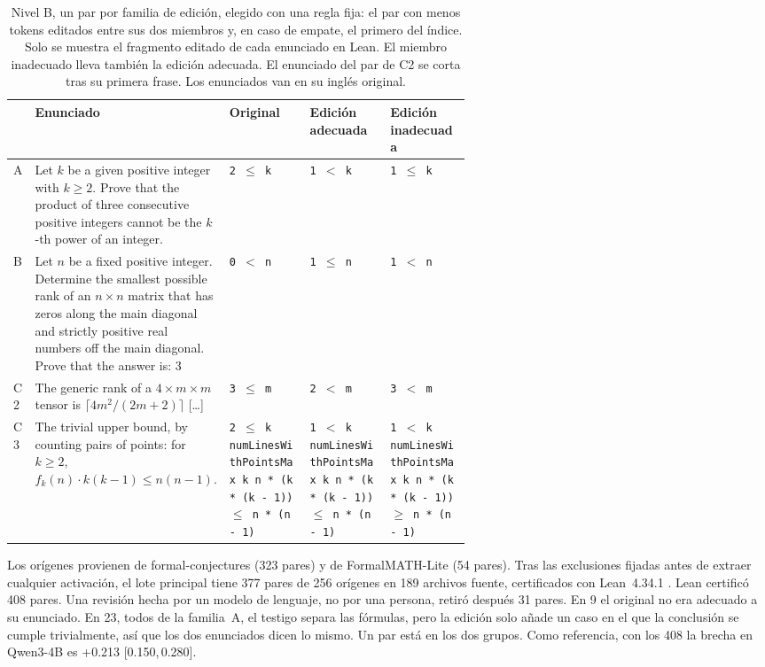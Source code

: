 \documentclass[10pt]{article}
\newcommand{\ic}[2]{[#1,\,#2]}
\begin{document}
\begin{table}[h]
\centering
\caption{Nivel B, un par por familia de edición, elegido con una regla fija: el par con menos tokens editados entre sus dos miembros y, en caso de empate, el primero del índice. Solo se muestra el fragmento editado de cada enunciado en Lean. El miembro inadecuado lleva también la edición adecuada. El enunciado del par de C2 se corta tras su primera frase. Los enunciados van en su inglés original.}
\label{tab:bejemplos}
\vspace{2pt}
{\footnotesize
\begin{tabularx}{\linewidth}{@{}lX>{\raggedright\arraybackslash}p{0.2\linewidth}>{\raggedright\arraybackslash}p{0.2\linewidth}>{\raggedright\arraybackslash}p{0.2\linewidth}@{}}
\toprule
 & Enunciado & Original & Edición adecuada & Edición inadecuada\\
\midrule
A & Let \(k\) be a given positive integer with \(k\geqslant2\). Prove that the product of three consecutive positive integers cannot be the \(k\) -th power of an integer. & \texttt{2 $\le$ k} & \texttt{1 $<$ k} & \texttt{1 $\le$ k}\\
\addlinespace
B & Let $n$ be a fixed positive integer. Determine the smallest possible rank of an $n \times n$ matrix that has zeros along the main diagonal and strictly positive real numbers off the main diagonal. Prove that the answer is: 3 & \texttt{0 $<$ n} & \texttt{1 $\le$ n} & \texttt{1 $<$ n}\\
\addlinespace
C2 & The generic rank of a $4 \times m \times m$ tensor is $\lceil 4m^2 / (2m + 2) \rceil$ [\ldots] & \texttt{3 $\le$ m} & \texttt{2 $<$ m} & \texttt{3 $<$ m}\\
\addlinespace
C3 & The trivial upper bound, by counting pairs of points: for $k \geq 2$, $f_k(n) \cdot k(k-1) \leq n(n-1).$ & \texttt{2 $\le$ k} \newline \texttt{numLinesWithPointsMax k n * (k * (k - 1)) $\le$ n * (n - 1)} & \texttt{1 $<$ k} \newline \texttt{numLinesWithPointsMax k n * (k * (k - 1)) $\le$ n * (n - 1)} & \texttt{1 $<$ k} \newline \texttt{numLinesWithPointsMax k n * (k * (k - 1)) $\ge$ n * (n - 1)}\\
\bottomrule
\end{tabularx}}
\end{table}

Los orígenes provienen de formal-conjectures \citep{fc,fcpaper} (323 pares) y de
FormalMATH-Lite \citep{formalmath} (54 pares). Tras las exclusiones fijadas antes de extraer cualquier activación, el
lote principal tiene 377 pares de 256 orígenes en 189 archivos fuente, certificados con Lean~4.34.1 \citep{lean4,mathlib}.
Lean certificó 408 pares. Una revisión hecha por un modelo de lenguaje, no por una persona, retiró después 31 pares. En 9 el original no era
adecuado a su enunciado. En 23, todos de la familia~A, el testigo separa las fórmulas, pero la edición solo añade un
caso en el que la conclusión se cumple trivialmente, así que los dos enunciados dicen lo mismo. Un par está en los dos
grupos. Como referencia, con los 408 la brecha en Qwen3-4B es +0.213 \ic{0.150}{0.280}.
\end{document}
